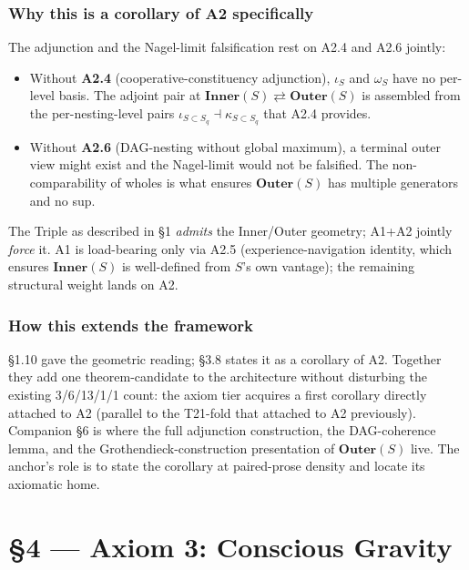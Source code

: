 \documentclass[11pt, openany]{book}
\newcommand{\sectionbreak}{\clearpage}
\begin{document}
\subsection{Why this is a corollary of A2 specifically}

The adjunction and the Nagel-limit falsification rest on A2.4 and A2.6 jointly:

\begin{itemize}
\item Without \textbf{A2.4} (cooperative-constituency adjunction), $\iota_S$ and $\omega_S$ have no per-level basis. The adjoint pair at $\mathbf{Inner}(S) \rightleftarrows \mathbf{Outer}(S)$ is assembled from the per-nesting-level pairs $\iota_{S \subset S_q} \dashv \kappa_{S \subset S_q}$ that A2.4 provides.

\item Without \textbf{A2.6} (DAG-nesting without global maximum), a terminal outer view might exist and the Nagel-limit would not be falsified. The non-comparability of wholes is what ensures $\mathbf{Outer}(S)$ has multiple generators and no sup.
\end{itemize}

The Triple as described in §1 \textit{admits} the Inner/Outer geometry; A1+A2 jointly \textit{force} it. A1 is load-bearing only via A2.5 (experience-navigation identity, which ensures $\mathbf{Inner}(S)$ is well-defined from $S$'s own vantage); the remaining structural weight lands on A2.

\subsection{How this extends the framework}

§1.10 gave the geometric reading; §3.8 states it as a corollary of A2. Together they add one theorem-candidate to the architecture without disturbing the existing 3/6/13/1/1 count: the axiom tier acquires a first corollary directly attached to A2 (parallel to the T21-fold that attached to A2 previously). Companion §6 is where the full adjunction construction, the DAG-coherence lemma, and the Grothendieck-construction presentation of $\mathbf{Outer}(S)$ live. The anchor's role is to state the corollary at paired-prose density and locate its axiomatic home.

\sectionbreak


\chapter{§4 — Axiom 3: Conscious Gravity}
\end{document}
